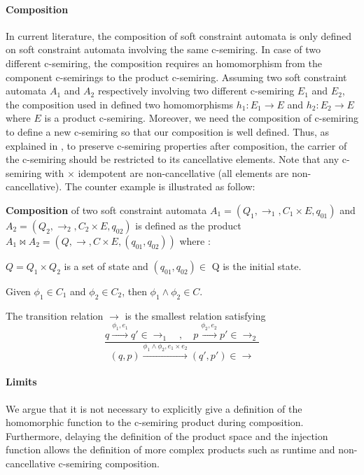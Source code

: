 \paragraph{Composition} 
In current literature, the composition of soft constraint automata is only defined on soft constraint automata involving the same c-semiring. In case of two different c-semiring, the composition requires an homomorphism from the component c-semirings to the product c-semiring. Assuming two soft constraint automata $A_1$ and $A_2$ respectively involving two different c-semiring $E_1$ and $E_2$, the composition used in \cite{?} defined two homomorphisms $h_1 : E_1 \rightarrow E$ and $h_2 : E_2 \rightarrow E$ where $E$ is a product c-semiring. Moreover, we need the composition of c-semiring to define a new c-semiring so that our composition is well defined. Thus, as explained in \cite{?}, to preserve c-semiring properties after composition, the carrier of the c-semiring should be restricted to its cancellative elements. Note that any c-semiring with $\times$ idempotent are non-cancellative (all elements are non-cancellative).
The counter example is illustrated as follow: 
\begin{definition}
	\textbf{Composition} of two soft constraint automata $A_1=(Q_1,\rightarrow_1, C_1 \times E, q_{01})$ and $A_2=(Q_2,\rightarrow_2, C_2\times E, q_{02})$ is defined as the product $ {A_1 \bowtie A_2} = (Q, \rightarrow, C\times E, (q_{01},q_{02}) )$ where : 
	\begin{list}{-}{ }
		\item $Q= Q_1 \times Q_2 $ is a set of state and $(q_{01},q_{02})\in$ Q is the initial state.
		\item Given $\phi_1 \in C_1$ and $\phi_2 \in C_2$, then $\phi_1 \land \phi_2 \in C$.
		\item The transition relation $\rightarrow$ is the smallest relation satisfying
		$$
		\frac{q \xrightarrow{\phi_1,e_1} q' \in \rightarrow _1 \quad , \quad p\xrightarrow{\phi_2,e_2}p' \in \rightarrow_2}{(q,p) \xrightarrow{\phi_1 \land \phi_2,e_1 \times e_2}(q',p') \in \rightarrow}
		$$
	\end{list}
\end{definition}
\paragraph{Limits}
We argue that it is not necessary to explicitly give a definition of the homomorphic function to the c-semiring product during composition. Furthermore, delaying the definition of the product space and the injection function allows the definition of more complex products such as runtime and non-cancellative c-semiring composition.